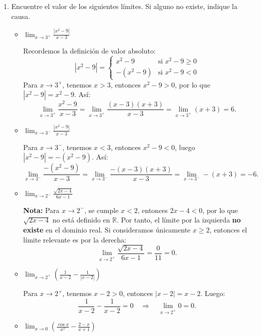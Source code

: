 \documentclass[12pt]{article}
\begin{document}
\begin{enumerate}[label=\arabic*.]
    \item Encuentre el valor de los siguientes límites. Si alguno no existe, indique la causa.
    \begin{itemize}
        \item[(a)] $\displaystyle \lim_{x\to3^+} \frac{|x^2-9|}{x-3}$
        
        Recordemos la definición de valor absoluto:
        \[
        |x^2-9| = \begin{cases}
            x^2-9 & \text{si } x^2-9 \ge 0 \\
            -(x^2-9) & \text{si } x^2-9 < 0
        \end{cases}
        \]
        Para $x \to 3^+$, tenemos $x>3$, entonces $x^2-9>0$, por lo que $|x^2-9| = x^2-9$. Así:
        \[
        \lim_{x\to3^+} \frac{x^2-9}{x-3} = \lim_{x\to3^+} \frac{(x-3)(x+3)}{x-3} = \lim_{x\to3^+} (x+3) = 6.
        \]
        
        \item[(b)] $\displaystyle \lim_{x\to3^-} \frac{|x^2-9|}{x-3}$
        
        Para $x \to 3^-$, tenemos $x<3$, entonces $x^2-9<0$, luego $|x^2-9| = -(x^2-9)$. Así:
        \[
        \lim_{x\to3^-} \frac{-(x^2-9)}{x-3} = \lim_{x\to3^-} \frac{-(x-3)(x+3)}{x-3} = \lim_{x\to3^-} -(x+3) = -6.
        \]
        
        \item[(c)] $\displaystyle \lim_{x\to2^-}\frac{\sqrt{2x-4}}{6x-1}$
        
        \textbf{Nota:} Para $x \to 2^-$, se cumple $x<2$, entonces $2x-4<0$, por lo que $\sqrt{2x-4}$ no está definido en $\mathbb{R}$. Por tanto, el límite por la izquierda \textbf{no existe} en el dominio real. Si consideramos únicamente $x\ge2$, entonces el límite relevante es por la derecha:
        \[
        \lim_{x\to2^+}\frac{\sqrt{2x-4}}{6x-1} = \frac{0}{11} = 0.
        \]
        
        \item[(d)] $\displaystyle \lim_{x\to2^+}\left(\frac{1}{x-2}-\frac{1}{|x-2|}\right)$
        
        Para $x\to2^+$, tenemos $x-2>0$, entonces $|x-2| = x-2$. Luego:
        \[
        \frac{1}{x-2} - \frac{1}{x-2} = 0 \quad \Rightarrow \quad \lim_{x\to2^+} 0 = 0.
        \]
        
        \item[(e)] $\displaystyle \lim_{x\to0}\left(\frac{\cos x}{x^2}-\frac{2-x}{x+1}\right)$
        

\end{itemize}
\end{enumerate}
\end{document}
